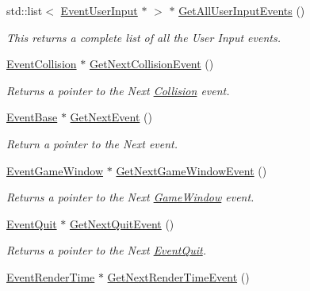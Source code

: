 \begin{DoxyCompactItemize}
std::list$<$ \hyperlink{classMezzanine_1_1EventUserInput}{EventUserInput} $\ast$ $>$ $\ast$ \hyperlink{classMezzanine_1_1EventManager_a50abe233b2f932105d0f33cd38badb26}{GetAllUserInputEvents} ()
\begin{DoxyCompactList}\small\item\em This returns a complete list of all the User Input events. \item\end{DoxyCompactList}\item 
\hyperlink{classMezzanine_1_1EventCollision}{EventCollision} $\ast$ \hyperlink{classMezzanine_1_1EventManager_adfba3feeb1e4174909db98412f894a3b}{GetNextCollisionEvent} ()
\begin{DoxyCompactList}\small\item\em Returns a pointer to the Next \hyperlink{classMezzanine_1_1Collision}{Collision} event. \item\end{DoxyCompactList}\item 
\hyperlink{classMezzanine_1_1EventBase}{EventBase} $\ast$ \hyperlink{classMezzanine_1_1EventManager_aea5b5a53dabead276cee5f94152bd9c2}{GetNextEvent} ()
\begin{DoxyCompactList}\small\item\em Return a pointer to the Next event. \item\end{DoxyCompactList}\item 
\hyperlink{classMezzanine_1_1EventGameWindow}{EventGameWindow} $\ast$ \hyperlink{classMezzanine_1_1EventManager_a60f9633517b214128a359c4ef92bafb7}{GetNextGameWindowEvent} ()
\begin{DoxyCompactList}\small\item\em Returns a pointer to the Next \hyperlink{classMezzanine_1_1GameWindow}{GameWindow} event. \item\end{DoxyCompactList}\item 
\hyperlink{classMezzanine_1_1EventQuit}{EventQuit} $\ast$ \hyperlink{classMezzanine_1_1EventManager_afd185415d7a139df30eb35309e8dee45}{GetNextQuitEvent} ()
\begin{DoxyCompactList}\small\item\em Returns a pointer to the Next \hyperlink{classMezzanine_1_1EventQuit}{EventQuit}. \item\end{DoxyCompactList}\item 
\hyperlink{classMezzanine_1_1EventRenderTime}{EventRenderTime} $\ast$ \hyperlink{classMezzanine_1_1EventManager_a9a1d195b08d34de39cbd72f95ab01190}{GetNextRenderTimeEvent} ()

\end{DoxyCompactItemize}
